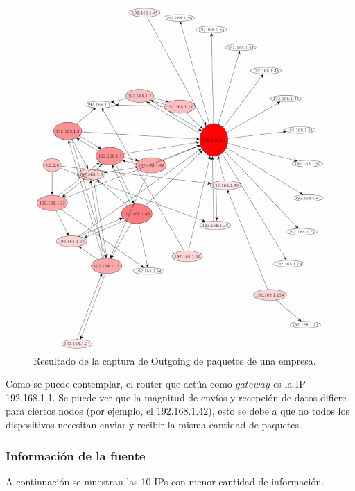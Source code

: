 \documentclass[10pt, a4paper]{article}
\begin{document}
\begin{figure}[H] %
\begin{center}
\includegraphics[width=400pt]{../imgs/tiarg-outgoing.png}
\caption{Resultado de la captura de Outgoing de paquetes de una empresa.}
\end{center}
\end{figure}

Como se puede contemplar, el router que actúa como $gateway$ es la IP 192.168.1.1. Se puede ver que la magnitud de envíos y recepción de datos difiere para ciertos nodos (por ejemplo, el 192.168.1.42), esto se debe a que no todos los dispositivos necesitan enviar y recibir la misma cantidad de paquetes.

\newpage
\subsubsection{Información de la fuente}

A continuación se muestran las 10 IPs con menor cantidad de información.
\end{document}
